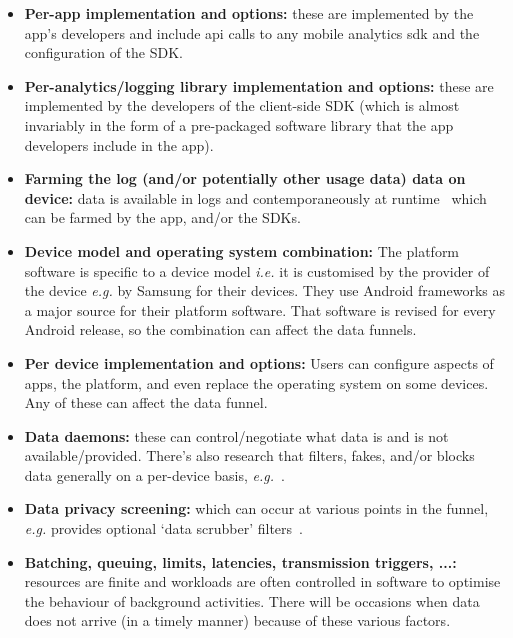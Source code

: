 \begin{itemize}
    \item \textbf{Per-app implementation and options:} these are implemented by the app's developers and include \Gls{api} calls to any mobile analytics \Gls{sdk} and the configuration of the SDK.
    \item \textbf{Per-analytics/logging library implementation and options:} these are implemented by the developers of the client-side SDK (which is almost invariably in the form of a pre-packaged software library that the app developers include in the app).
    \item \textbf{Farming the log (and/or potentially other usage data) data on device:} data is available in logs and contemporaneously at runtime~ which can be farmed by the app, and/or the SDKs. 
    \item \textbf{Device model and operating system combination:} The platform software is specific to a device model \emph{i.e.} it is customised by the provider of the device \emph{e.g.} by Samsung for their devices. They use Android frameworks as a major source for their platform software. That software is revised for every Android release, so the combination can affect the data funnels.~
    \item \textbf{Per device implementation and options:} Users can configure aspects of apps, the platform, and even replace the operating system on some devices. Any of these can affect the data funnel. 
    \item \textbf{Data daemons:} these can control/negotiate what data is and is not available/provided. There's also research that filters, fakes, and/or blocks data generally on a per-device basis, \emph{e.g.}~.
    \item \textbf{Data privacy screening:} which can occur at various points in the funnel, \emph{e.g.}  provides optional `data scrubber' filters~. 
    \item \textbf{Batching, queuing, limits, latencies, transmission triggers, ...:} resources are finite and workloads are often controlled in software to optimise the behaviour of background activities. There will be occasions when data does not arrive (in a timely manner) because of these various factors.

\end{itemize}
